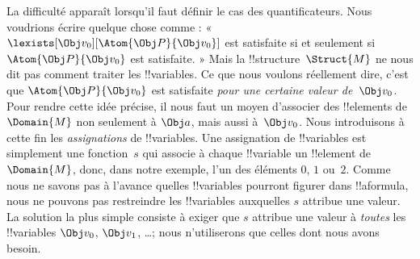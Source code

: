\documentclass[11pt,a4paper,openany]{memoir}
\begin{document}
La difficulté apparaît lorsqu'il faut définir le cas des
quantificateurs. Nous voudrions écrire quelque chose comme :
« $\lexists[\Obj v_0][\Atom{\Obj P}{\Obj v_0}]$ est satisfaite si et
seulement si $\Atom{\Obj P}{\Obj v_0}$ est satisfaite. » Mais la
!!{structure}~$\Struct{M}$ ne nous dit pas comment traiter les
!!{variable}s. Ce que nous voulons réellement dire, c'est que
$\Atom{\Obj P}{\Obj v_0}$ est satisfaite \emph{pour une certaine valeur
de~$\Obj v_0$}. Pour rendre cette idée précise, il nous faut un moyen
d'associer des !!{element}s de~$\Domain{M}$ non seulement à $\Obj a$,
mais aussi à~$\Obj v_0$. Nous introduisons à cette fin les
\emph{assignations} de !!{variable}s. Une assignation de
!!{variable}s est simplement une fonction~$s$ qui associe à chaque
!!{variable} un !!{element} de~$\Domain{M}$, donc, dans notre exemple,
l'un des
éléments $0$, $1$ ou~$2$. Comme nous ne savons pas à l'avance quelles
!!{variable}s pourront figurer dans !!a{formula}, nous ne pouvons pas
restreindre les !!{variable}s auxquelles $s$ attribue une valeur. La
solution la plus simple consiste à exiger que $s$ attribue une valeur à
\emph{toutes} les !!{variable}s $\Obj v_0$, $\Obj v_1$, \dots\@; nous
n'utiliserons que celles dont nous avons besoin.
\end{document}

